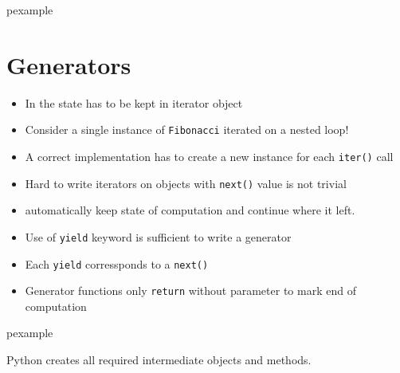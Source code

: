 \documentclass[trans,compress,xcolor=table]{beamer}
\begin{document}
\begin{frame}
\begin{beamercolorbox}{pexample}
\codefibiter
\end{beamercolorbox}
\end{frame}

\section{Generators}
\begin{frame}
\begin{itemize}
\item In  the state has to be kept in iterator object
\item Consider  a single instance of \lstinline!Fibonacci! iterated on a nested loop!
\item A correct implementation has to create a new instance for each \lstinline!iter()! call
\item Hard to write iterators on objects with \lstinline!next()! value is
	not trivial
\item {} automatically keep state of computation and continue where it left.
\item Use of \lstinline!yield! keyword is sufficient to write a generator
\item Each \lstinline!yield! corressponds to a \lstinline!next()!
\item Generator functions only \lstinline!return! without parameter to
	mark end of computation
\end{itemize}
\end{frame}

\begin{frame}
\begin{beamercolorbox}{pexample}
\codefibgen

Python creates all required intermediate objects and methods.
\end{beamercolorbox}
\end{frame}
\end{document}
